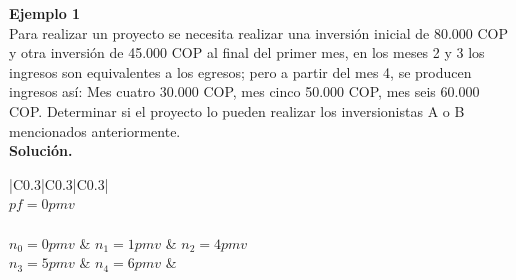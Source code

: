 \textbf{Ejemplo 1}\\
Para realizar un proyecto se necesita realizar una inversión inicial de 80.000 COP y otra inversión de
45.000 COP al final del primer mes, en los meses 2 y 3 los ingresos son equivalentes a los egresos;
pero a partir del mes 4, se producen ingresos así: Mes cuatro 30.000 COP, mes cinco 50.000 COP, mes
seis 60.000 COP. Determinar si el proyecto lo pueden realizar los inversionistas A o B mencionados
anteriormente.\\



\textbf{Solución.}\\
\begin{center}
	\renewcommand{\arraystretch}{1.5}%
	\begin{longtable}[H]{|C{0.3\linewidth}|C{0.3\linewidth}|C{0.3\linewidth}|}
		\hline
		   \\ \hline
		 {$pf = 0 pmv$} \\ \hline
		   \\ \hline
		$n_{0} = 0 pmv$   & $n_{1} = 1 pmv$ & $n_{2} =  4 pmv$\\
		$n_{3} = 5 pmv$ & $n_{4} = 6 pmv$ & \\ \hline
		 \\
		 \\ \hline



\end{longtable}
\end{center}
